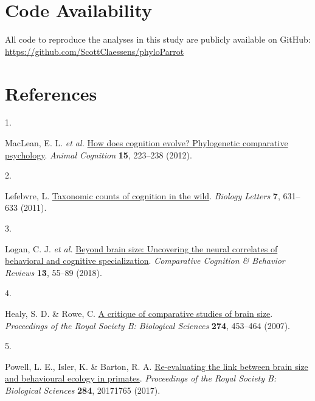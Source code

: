\documentclass[
  man,floatsintext]{apa6}
\newlength{\cslhangindent}
\newlength{\csllabelwidth}
\newlength{\cslentryspacingunit} %
\newenvironment{CSLReferences}[2] %
 {%
  \setlength{\parindent}{0pt}
  \ifodd #1
  \let\oldpar\par
  \def\par{\hangindent=\cslhangindent\oldpar}
  \fi
  \setlength{\parskip}{#2\cslentryspacingunit}
 }%
 {}
\newcommand{\CSLLeftMargin}[1]{\parbox[t]{\csllabelwidth}{#1}}
\newcommand{\CSLRightInline}[1]{\parbox[t]{\linewidth - \csllabelwidth}{#1}\break}
\begin{document}
\hypertarget{code-availability}{%
\section{Code Availability}\label{code-availability}}

All code to reproduce the analyses in this study are publicly available on GitHub: \url{https://github.com/ScottClaessens/phyloParrot}

\newpage

\hypertarget{references}{%
\section{References}\label{references}}

\begingroup

\hypertarget{refs}{}
\begin{CSLReferences}{0}{0}
\leavevmode{}%
\CSLLeftMargin{1. }%
\CSLRightInline{MacLean, E. L. \emph{et al.} \href{https://doi.org/10.1007/s10071-011-0448-8}{How does cognition evolve? Phylogenetic comparative psychology}. \emph{Animal Cognition} \textbf{15}, 223--238 (2012).}

\leavevmode{}%
\CSLLeftMargin{2. }%
\CSLRightInline{Lefebvre, L. \href{https://doi.org/10.1098/rsbl.2010.0556}{Taxonomic counts of cognition in the wild}. \emph{Biology Letters} \textbf{7}, 631--633 (2011).}

\leavevmode{}%
\CSLLeftMargin{3. }%
\CSLRightInline{Logan, C. J. \emph{et al.} \href{https://doi.org/10.3819/CCBR.2018.130008}{Beyond brain size: Uncovering the neural correlates of behavioral and cognitive specialization}. \emph{Comparative Cognition \& Behavior Reviews} \textbf{13}, 55--89 (2018).}

\leavevmode{}%
\CSLLeftMargin{4. }%
\CSLRightInline{Healy, S. D. \& Rowe, C. \href{https://doi.org/10.1098/rspb.2006.3748}{A critique of comparative studies of brain size}. \emph{Proceedings of the Royal Society B: Biological Sciences} \textbf{274}, 453--464 (2007).}

\leavevmode{}%
\CSLLeftMargin{5. }%
\CSLRightInline{Powell, L. E., Isler, K. \& Barton, R. A. \href{https://doi.org/10.1098/rspb.2017.1765}{Re-evaluating the link between brain size and behavioural ecology in primates}. \emph{Proceedings of the Royal Society B: Biological Sciences} \textbf{284}, 20171765 (2017).}


\end{CSLReferences}
\end{document}
